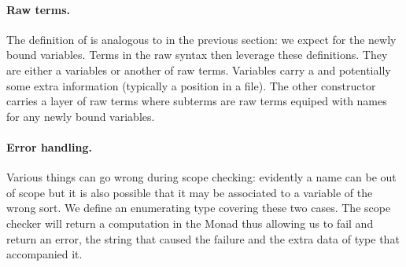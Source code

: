\noindent
\begin{minipage}{\textwidth}
\begin{minipage}[t]{0.64\textwidth}
\end{minipage}
\begin{minipage}[t]{0.35\textwidth}
\end{minipage}
\end{minipage}

\paragraph*{Raw terms.}
The definition of  is analogous to  in the
previous section: we expect  for the newly bound
variables. Terms in the raw syntax then leverage these
definitions. They are either a variables or another  of raw
terms. Variables  carry a  and potentially some
extra information  (typically a position in a file). The other
constructor  carries a layer of raw terms where subterms are
raw terms equiped with names for any newly bound variables.

\begin{agdasnippet}
\end{agdasnippet}

\paragraph*{Error handling.} Various things can go wrong during scope checking:
evidently a name can be out of scope but it is also possible that it may be
associated to a variable of the wrong sort. We define an enumerating type
covering these two cases. The scope checker will return a computation in the
Monad  thus allowing us to fail and return an error, the string that
caused the failure and the extra data of type  that accompanied it.

\noindent
\begin{minipage}{\textwidth}
\begin{minipage}[t]{0.5\textwidth}
\end{minipage}
\begin{minipage}[t]{0.4\textwidth}
\end{minipage}
\end{minipage}

